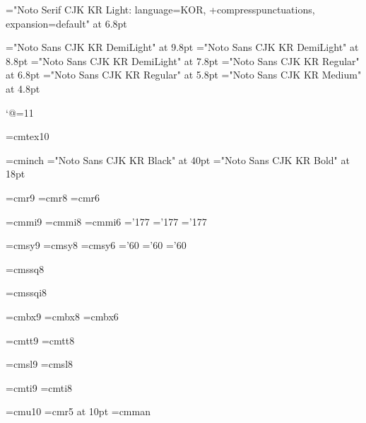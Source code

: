 \sethangulfont\sevenmj="Noto Serif CJK KR Light:%
  language=KOR,%
  +compresspunctuations,%
  expansion=default" at 6.8pt

\font\texthangul="Noto Sans CJK KR DemiLight" at 9.8pt
\font\texthangulnine="Noto Sans CJK KR DemiLight" at 8.8pt
\font\texthanguleight="Noto Sans CJK KR DemiLight" at 7.8pt
\font\scripthangul="Noto Sans CJK KR Regular" at 6.8pt
\font\scripthangulsix="Noto Sans CJK KR Regular" at 5.8pt
\font\scriptscripthangul="Noto Sans CJK KR Medium" at 4.8pt

%
\catcode`@=11 %

\font\tentex=cmtex10

\font\inchhigh=cminch
\font\titlefont="Noto Sans CJK KR Black" at 40pt
\font\sectitlefont="Noto Sans CJK KR Bold" at 18pt

\font\ninerm=cmr9
\font\eightrm=cmr8
\font\sixrm=cmr6

\font\ninei=cmmi9
\font\eighti=cmmi8
\font\sixi=cmmi6
\skewchar\ninei='177 \skewchar\eighti='177 \skewchar\sixi='177

\font\ninesy=cmsy9
\font\eightsy=cmsy8
\font\sixsy=cmsy6
\skewchar\ninesy='60 \skewchar\eightsy='60 \skewchar\sixsy='60

\font\eightss=cmssq8

\font\eightssi=cmssqi8

\font\ninebf=cmbx9
\font\eightbf=cmbx8
\font\sixbf=cmbx6

\font\ninett=cmtt9
\font\eighttt=cmtt8

\hyphenchar{} %
\hyphenchar{}
\hyphenchar{}

\font\ninesl=cmsl9
\font\eightsl=cmsl8

\font\nineit=cmti9
\font\eightit=cmti8

\font\tenu=cmu10 %
\font\magnifiedfiverm=cmr5 at 10pt
\font\cmman=cmman %

%
\newskip\ttglue
\def\tenpoint{\def\rm{\fam0\tenrm}%
  \textfont0=\tenrm \scriptfont0=\sevenrm \scriptscriptfont0=\fiverm
  \textfont1=\teni \scriptfont1=\seveni \scriptscriptfont1=\fivei
  \textfont2=\tensy \scriptfont2=\sevensy \scriptscriptfont2=\fivesy
  \textfont3=\tenex \scriptfont3=\tenex \scriptscriptfont3=\tenex
  \setmathhangulfonts\texthangul\scripthangul\scriptscripthangul
  \def\it{\fam\itfam\tenit}%
  \textfont\itfam=\tenit
  \def\sl{\fam\slfam\tensl}%
  \textfont\slfam=\tensl
  \def\bf{\fam\bffam\tenbf}%
  \textfont\bffam=\tenbf \scriptfont\bffam=\sevenbf
   \scriptscriptfont\bffam=\fivebf
  \def\tt{\fam\ttfam\tentt}%
  \textfont\ttfam=\tentt
  \expandafter\def\expandafter\rm\expandafter{\rm\tenmj}
  \expandafter\def\expandafter\tt\expandafter{\tt\tentz}
  \expandafter\def\expandafter\bf\expandafter{\bf\tenbd}
  \expandafter\def\expandafter\sl\expandafter{\sl\tensn}
  \expandafter\def\expandafter\it\expandafter{\it\tensn}  
  \tt \ttglue=.5em plus.25em minus.15em
  \normalbaselineskip=15pt
  \let\sc=\eightrm
  \let\big=\tenbig
  \setbox\strutbox=\hbox{\vrule height8.5pt depth3.5pt width\z@}%
  \normalbaselines\rm}

